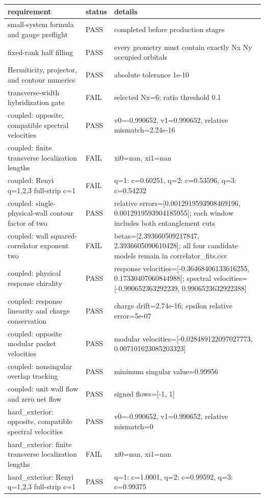 \documentclass[aps,prb,onecolumn,nofootinbib,superscriptaddress]{revtex4-2}
\begin{document}
\begin{longtable}{p{}p{}p{}}
\toprule
requirement & status & details \\
\midrule
small-system formula and gauge preflight & PASS & completed before production stages \\
fixed-rank half filling & PASS & every geometry must contain exactly Nx Ny occupied orbitals \\
Hermiticity, projector, and contour numerics & PASS & absolute tolerance 1e-10 \\
transverse-width hybridization gate & FAIL & selected Nx=6; ratio threshold 0.1 \\
coupled: opposite, compatible spectral velocities & PASS & v0=-0.990652, v1=0.990652, relative mismatch=2.24e-16 \\
coupled: finite transverse localization lengths & FAIL & xi0=nan, xi1=nan \\
coupled: Renyi q=1,2,3 full-strip c=1 & FAIL & q=1: c=0.60251, q=2: c=0.53596, q=3: c=0.54232 \\
coupled: single-physical-wall contour factor of two & PASS & relative errors=[0.0012919593908469196, 0.0012919593904185955]; each window includes both entanglement cuts \\
coupled: wall squared-correlator exponent two & FAIL & betas=[2.393660509217847, 2.3936605090610428]; all four candidate models remain in correlator\_fits.csv \\
coupled: physical response chirality & PASS & response velocities=[-0.36468406133616255, 0.17330407060844988]; spectral velocities=[-0.990652363292239, 0.9906523632922388] \\
coupled: response linearity and charge conservation & PASS & charge drift=2.74e-16; epsilon relative error=5e-07 \\
coupled: opposite modular packet velocities & PASS & modular velocities=[-0.028489122097027773, 0.007101623085203323] \\
coupled: nonsingular overlap tracking & PASS & minimum singular value=0.99956 \\
coupled: unit wall flow and zero net flow & PASS & signed flows=[-1, 1] \\
hard\_exterior: opposite, compatible spectral velocities & PASS & v0=-0.990652, v1=0.990652, relative mismatch=0 \\
hard\_exterior: finite transverse localization lengths & FAIL & xi0=nan, xi1=nan \\
hard\_exterior: Renyi q=1,2,3 full-strip c=1 & PASS & q=1: c=1.0001, q=2: c=0.99592, q=3: c=0.99375 \\

\end{longtable}
\end{document}
